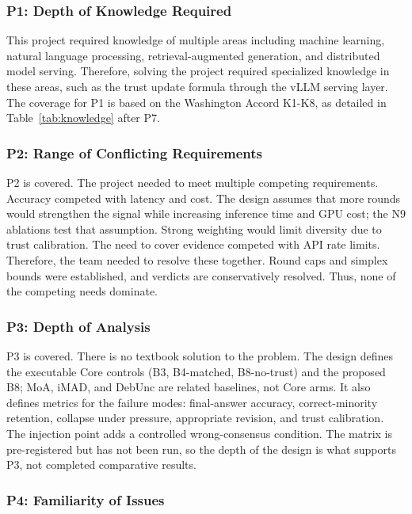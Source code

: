 \subsubsection{P1: Depth of Knowledge Required}

This project required knowledge of multiple areas including machine learning, natural language processing, retrieval-augmented generation, and distributed model serving. Therefore, solving the project required specialized knowledge in these areas, such as the trust update formula through the vLLM serving layer. The coverage for P1 is based on the Washington Accord K1-K8, as detailed in Table~\ref{tab:knowledge} after P7.

\subsubsection{P2: Range of Conflicting Requirements}

P2 is covered. The project needed to meet multiple competing requirements. Accuracy competed with latency and cost. The design assumes that more rounds would strengthen the signal while increasing inference time and GPU cost; the N9 ablations test that assumption. Strong weighting would limit diversity due to trust calibration. The need to cover evidence competed with API rate limits. Therefore, the team needed to resolve these together. Round caps and simplex bounds were established, and verdicts are conservatively resolved. Thus, none of the competing needs dominate.

\subsubsection{P3: Depth of Analysis}

P3 is covered. There is no textbook solution to the problem. The design defines the executable Core controls (B3, B4-matched, B8-no-trust) and the proposed B8; MoA, iMAD, and DebUnc are related baselines, not Core arms. It also defines metrics for the failure modes: final-answer accuracy, correct-minority retention, collapse under pressure, appropriate revision, and trust calibration. The injection point adds a controlled wrong-consensus condition. The matrix is pre-registered but has not been run, so the depth of the design is what supports P3, not completed comparative results.

\subsubsection{P4: Familiarity of Issues}

